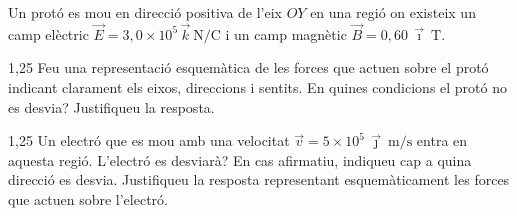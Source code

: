Un protó es mou en direcció positiva de l'eix $OY$ en una regió on existeix un camp elèctric $\vec{E} = 3,0\times 10^{5}\,\vec{k}\ \mathrm{N/C}$ i un camp magnètic $\vec{B} = 0,60\,\vec{\imath}\ \mathrm{T}$.

\begin{apartat}{1,25}
Feu una representació esquemàtica de les forces que actuen sobre el protó indicant clarament els eixos, direccions i sentits. En quines condicions el protó no es desvia? Justifiqueu la resposta.
\end{apartat}

\begin{apartat}{1,25}
Un electró que es mou amb una velocitat $\vec{v} = 5\times 10^{5}\,\vec{\jmath}\ \mathrm{m/s}$ entra en aquesta regió. L'electró es desviarà? En cas afirmatiu, indiqueu cap a quina direcció es desvia. Justifiqueu la resposta representant esquemàticament les forces que actuen sobre l'electró.
\end{apartat}
